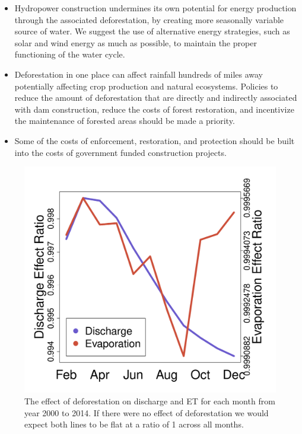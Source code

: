 \documentclass[DIV=calc, paper=a4, fontsize=11pt, twocolumn]{scrartcl}	 %
\begin{document}
\renewcommand{\labelitemi}{${\color{DarkGoldenrod}\bullet}$}
\begin{itemize}
\item Hydropower construction undermines its own potential for energy production through the associated deforestation, by creating more seasonally variable source of water. We suggest the use of alternative energy strategies, such as solar and wind energy as much as possible, to maintain the proper functioning of the water cycle.
\item Deforestation in one place can affect rainfall hundreds of miles away potentially affecting crop production and natural ecosystems. Policies to reduce the amount of deforestation that are directly and indirectly associated with dam construction, reduce the costs of forest restoration, and incentivize the maintenance of forested areas should be made a priority. 
\item Some of the costs of enforcement, restoration, and protection should be built into the costs of government funded construction projects.
\end{itemize}


\begin{figure}[h]
\vspace{-3.5em}
  \includegraphics[width=1\linewidth]{SeasonalEffects.pdf}
\vspace{-2em}
 \caption{The effect of deforestation on discharge and ET for each month from year 2000 to 2014. If there were no effect of deforestation we would expect both lines to be flat at a ratio of 1 across all months.}
  \label{fig:deforest}
\vspace{-2em}
\end{figure}
\end{document}
